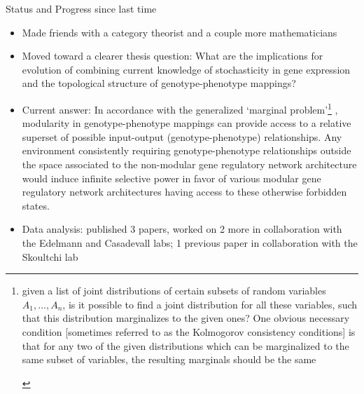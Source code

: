 

%

\newtoggle{thmsty}
\togglefalse{thmsty}

\newtoggle{longpres}
\togglefalse{longpres}









	\begin{frame}
		\titlepage
	\end{frame}
	
	\begin{frame}
	\begin{block}{Status and Progress since last time}
	\begin{scriptsize}	
	\begin{itemize}
	\item Made friends with a category theorist and a couple more mathematicians
	\item Moved toward a clearer thesis question: What are the implications for evolution of combining current knowledge of stochasticity in gene expression and the topological structure of genotype-phenotype mappings? 
	\item Current answer: In accordance with the generalized `marginal problem'\footnote{\begin{tiny}
given a list of joint distributions of certain subsets of random variables $A_1, \ldots , A_n$, is it possible to find a joint distribution for all these variables, such that this distribution marginalizes to the given ones? One obvious necessary condition [sometimes referred to as the Kolmogorov consistency conditions] is that for any two of the given distributions which can be marginalized to the same subset of variables, the resulting marginals should be the same \cite{Fritz}
	\end{tiny}} , modularity in genotype-phenotype mappings can provide access to a relative superset of possible input-output (genotype-phenotype) relationships. Any environment consistently requiring genotype-phenotype relationships outside the space associated to the non-modular gene regulatory network architecture would induce infinite selective power in favor of various modular gene regulatory network architectures having access to these otherwise forbidden states.
	\item Data analysis: published 3 papers, worked on 2 more in collaboration with the Edelmann and Casadevall labs; 1 previous paper in collaboration with the Skoultchi lab
	\end{itemize}		
	\end{scriptsize}
	\end{block}
	\end{frame}

